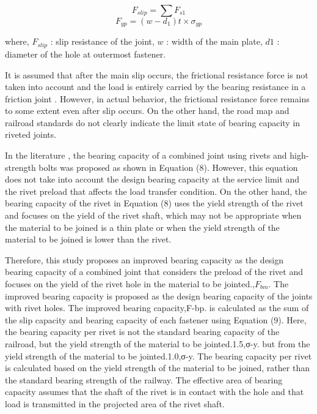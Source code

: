 \begin{equation}\label{fslip-ch4}
    F_{slip} = \sum F_{s1}
\end{equation}
\begin{equation}\label{fyp-ch4}
    F_{yp} = (w-d_1)t\times \sigma_{yp}
\end{equation}

where, $F_{slip}$ : slip resistance of the joint, $w$ : width of the main plate, $d1$ : diameter of the hole at outermost fastener.

It is assumed that after the main slip occurs, the frictional resistance force is not taken into account and the load is entirely carried by the bearing resistance in a friction joint \cite{rivet1977}. However, in actual behavior, the frictional resistance force remains to some extent even after slip occurs. On the other hand, the road map and railroad standards do not clearly indicate the limit state of bearing capacity in riveted joints.

In the literature \cite{hashimoto2008}, the bearing capacity of a combined joint using rivets and high-strength bolts was proposed as shown in Equation (8). However, this equation does not take into account the design bearing capacity at the service limit and the rivet preload that affects the load transfer condition. On the other hand, the bearing capacity of the rivet in Equation (8) uses the yield strength of the rivet and focuses on the yield of the rivet shaft, which may not be appropriate when the material to be joined is a thin plate or when the yield strength of the material to be joined is lower than the rivet.

Therefore, this study proposes an improved bearing capacity as the design bearing capacity of a combined joint that considers the preload of the rivet and focuses on the yield of the rivet hole in the material to be jointed.,$F_{bm}$. The improved bearing capacity is proposed as the design bearing capacity of the joints with rivet holes. The improved bearing capacity,F-bp. is calculated as the sum of the slip capacity and bearing capacity of each fastener using Equation (9). Here, the bearing capacity per rivet is not the standard bearing capacity of the railroad, but the yield strength of the material to be jointed.1.5,σ-y. but from the yield strength of the material to be jointed.1.0,σ-y. The bearing capacity per rivet is calculated based on the yield strength of the material to be joined, rather than the standard bearing strength of the railway. The effective area of bearing capacity assumes that the shaft of the rivet is in contact with the hole and that load is transmitted in the projected area of the rivet shaft.

